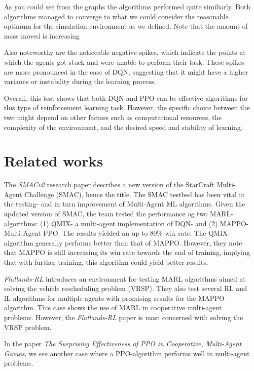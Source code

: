 \documentclass[conference]{IEEEtran}
\begin{document}
As you could see from the graphs the algorithms performed quite similiarly.
Both algorithms managed to converge to what we could consider the reasonable optimum for the simulation
environment as we defined. Note that the amount of mass moved is increasing

Also noteworthy are the noticeable negative spikes, which indicate the points at which the agents got
stuck and were unable to perform their task. These spikes are more pronounced in the case of DQN,
suggesting that it might have a higher variance or instability during the learning process.

Overall, this test shows that both DQN and PPO can be effective algorithms for this type of reinforcement
learning task. However, the specific choice between the two might depend on other factors such as
computational resources, the complexity of the environment, and the desired speed and stability of
learning.




\section{Related works}
The \textit{SMACv2} \cite{ellis2022smacv2} research paper describes a new version of the StarCraft Multi-Agent
Challenge (SMAC), hence the title. The SMAC testbed has been vital in the testing- and in turn improvement
of Multi-Agent ML algorithms. Given the updated version of SMAC, the team tested the performance og two
MARL- algorithms: (1) QMIX- a multi-agent implementation of DQN- and (2) MAPPO- Multi-Agent PPO. The
results yielded an up to 80\% win rate. The QMIX-algorithm generally performs better than that of MAPPO.
However, they note that MAPPO is still increasing its win rate towards the end of training, implying
that with further training, this algorithm could yield better results.

\textit{Flatlands-RL} \cite{laurent2021flatland} introduces an environment for testing MARL algorithms aimed at
solving the vehicle rescheduling problem (VRSP). They also test several RL and IL algorithms for
multiple agents with promising results for the MAPPO algorithm. This case shows the use of MARL in cooperative
multi-agent problems. However, the \textit{Flatlands-RL} paper is most concerned with solving the VRSP problem.

In the paper \textit{The Surprising Effectiveness of PPO in Cooperative, Multi-Agent Games}, \cite{yu2022surprising}
we see another case where a PPO-algorithm performs well in multi-agent problems.
\end{document}
